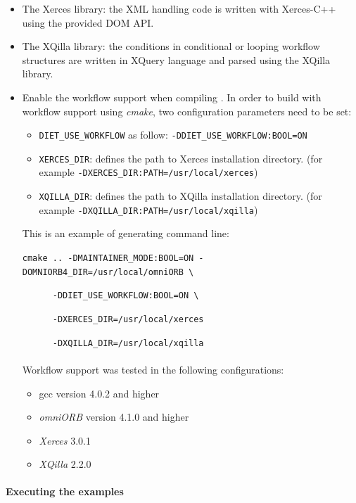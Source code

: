 \begin{itemize}
\item The Xerces library: the XML handling code is written with
  Xerces-C++ using the provided DOM API.
\item The XQilla library: the conditions in conditional or looping workflow
  structures are written in XQuery language and parsed using the XQilla library.
\item Enable the workflow support when compiling \diet. In order to build \diet
  with workflow support using \textit{cmake}, two configuration parameters need
 to be set:

\begin{itemize}
\item \texttt{DIET\_USE\_WORKFLOW} as follow: \texttt{-DDIET\_USE\_WORKFLOW:BOOL=ON}
\item \texttt{XERCES\_DIR}: defines the path to Xerces installation directory.
  (for example \texttt{-DXERCES\_DIR:PATH=/usr/local/xerces})
\item \texttt{XQILLA\_DIR}: defines the path to XQilla installation directory.
  (for example \texttt{-DXQILLA\_DIR:PATH=/usr/local/xqilla})
\end{itemize}

This is an example of generating command line:

\verb|cmake .. -DMAINTAINER_MODE:BOOL=ON -DOMNIORB4_DIR=/usr/local/omniORB \|

\verb|      -DDIET_USE_WORKFLOW:BOOL=ON \|

\verb|      -DXERCES_DIR=/usr/local/xerces|

\verb|      -DXQILLA_DIR=/usr/local/xqilla|

\paragraph{}
Workflow support was tested in the following configurations:

\begin{itemize}
\item gcc version 4.0.2 and higher
\item \textit{omniORB} version 4.1.0 and higher
\item \textit{Xerces} 3.0.1
\item \textit{XQilla} 2.2.0
\end{itemize}
\end{itemize}

\paragraph{Executing the examples}
\label{sec:wf_examples}

